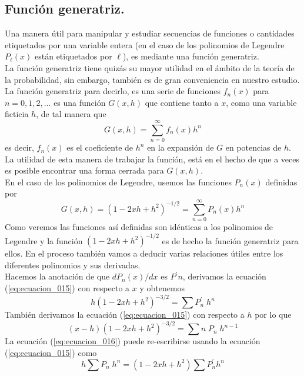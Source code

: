 \subsection*{Función generatriz.}
Una manera útil para manipular y estudiar secuencias de funciones o cantidades etiquetados por una variable entera (en el caso de los polinomios de Legendre $P_{\ell} (x)$ están etiquetados por $\ell$), es mediante una función generatriz. 
\\
La función generatriz tiene quizás su mayor utilidad en el ámbito de la teoría de la probabilidad, sin embargo, también es de gran conveniencia en nuestro estudio.
\\
La función generatriz para decirlo, es una serie de funciones $f_{n} (x)$ para $n = 0, 1, 2,\ldots$ es una función $G (x, h)$ que contiene tanto a $x$, como una variable ficticia $h$, de tal manera que
\[ G(x,h) = \sum_{n=0}^{\infty} f_{n} (x) h^{n} \]
es decir, $f_{n}(x)$ es el coeficiente de $h^{n}$ en la expansión de $G$ en potencias de $h$. La  utilidad de esta manera de trabajar la función, está en el hecho de que a veces es posible encontrar una forma cerrada para $G(x,h)$.
\\
En el caso de los polinomios de Legendre, usemos las funciones $P_{n}(x)$ definidas por
\begin{equation}
G(x,h) = (1 - 2xh + h^{2})^{-1/2} =  \sum_{n=0}^{\infty} P_{n}(x) h^{n}
\label{eq:ecuacion_015}
\end{equation}
Como veremos las funciones así definidas son idénticas a los polinomios de Legendre y la función $(1 - 2xh + h^{2})^{-1/2}$ es de hecho la función generatriz para ellos. En el proceso también vamos a deducir varias relaciones útiles entre los diferentes polinomios y sus derivadas.
\\
Hacemos la anotación de que $d P_{n}(x) / dx$ es $P^{\prime} n$, derivamos la ecuación (\ref{eq:ecuacion_015}) con respecto a $x$ y obtenemos
\begin{equation}
h (1 - 2xh + h^{2})^{-3/2} = \sum P^{\prime}_{n} \; h^{n}
\label{eq:ecuacion_016}
\end{equation}
También derivamos la ecuación (\ref{eq:ecuacion_015}) con respecto a $h$ por lo que
\begin{equation}
(x-h) (1- 2xh + h^{2})^{-3/2} = \sum n \; P_{n} \; h^{n-1}
\label{eq:ecuacion_017}
\end{equation}
La ecuación (\ref{eq:ecuacion_016}) puede re-escribirse usando la ecuación (\ref{eq:ecuacion_015}) como
\[ h \sum P_{n} \; h^{n} =  (1 - 2xh + h^{2}) \sum P^{\prime}_{n} h^{n} \]
